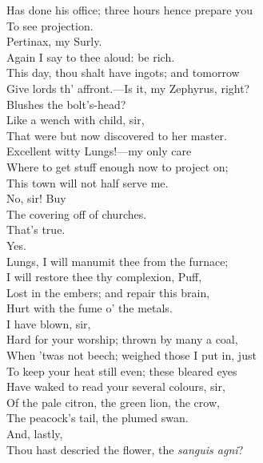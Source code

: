 \documentclass[a4paper,oneside,12pt]{memoir}
\begin{document}
\begin{drama*}
Has done his office; three hours hence prepare you\\
To see projection.\\
\mammonspeaks {} Pertinax, my Surly.\\
Again I say to thee aloud: be rich.\\
This day, thou shalt have ingots; and tomorrow\\
Give lords th' affront.---Is it, my Zephyrus, right?\\
Blushes the bolt's-head?\\
\facespeaks {} Like a wench with child, sir,\\
That were but now discovered to her master.\\
\mammonspeaks Excellent witty Lungs!---my only care\\
Where to get stuff enough now to project on;\\
This town will not half serve me.\\
\facespeaks {} No, sir! Buy\\
The covering off of churches.\\
\mammonspeaks {} That's true.\\
\facespeaks {} Yes.\\
\mammonspeaks Lungs, I will manumit thee from the furnace;\\
I will restore thee thy complexion, Puff,\\
Lost in the embers; and repair this brain,\\
Hurt with the fume o' the metals.\\
\facespeaks {} I have blown, sir,\\
Hard for your worship; thrown by many a coal,\\
When 'twas not beech; weighed those I put in, just\\
To keep your heat still even; these bleared eyes\\
Have waked to read your several colours, sir,\\
Of the pale citron, the green lion, the crow,\\
The peacock's tail, the plumed swan.\\
\mammonspeaks {} And, lastly,\\
Thou hast descried the flower, the \emph{sanguis agni}?\\

\end{drama*}
\end{document}
